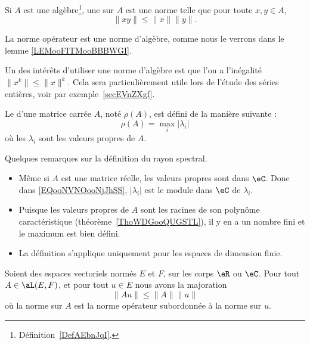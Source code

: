 \begin{definition}  \label{DefJWRWQue}
    Si \( A\) est une algèbre\footnote{Définition~\ref{DefAEbnJqI}.}, une  sur \( A\) est une norme telle que pour toute \( x,y\in A\),
    \begin{equation}
        \| xy \|\leq \| x \|\| y \|.
    \end{equation}
\end{definition}
La norme opérateur est une norme d'algèbre, comme nous le verrons dans le lemme \ref{LEMooFITMooBBBWGI}.

Un des intérêts d'utiliser une norme d'algèbre est que l'on a l'inégalité \( \| x^k \|\leq \| x \|^k \). Cela sera particulièrement utile lors de l'étude des séries entières, voir par exemple~\ref{secEVnZXgf}.

\begin{definition}      \label{DEFooEAUKooSsjqaL}
    Le  d'une matrice carrée $A$, noté $\rho(A)$, est défini de la manière suivante :
    \begin{equation}    \label{EQooNVNOooNjJhSS}
        \rho(A)=\max_i|\lambda_i|
    \end{equation}
    où les $\lambda_i$ sont les valeurs propres de $A$.
\end{definition}

\begin{normaltext}
    Quelques remarques sur la définition du rayon spectral.
    \begin{itemize}
        \item
            Même si \( A\) est une matrice réelle, les valeurs propres sont dans \( \eC\). Donc dans \eqref{EQooNVNOooNjJhSS}, \( | \lambda_i |\) est le module dans \( \eC\) de \( \lambda_i\).
        \item
            Puisque les valeurs propres de \( A\) sont les racines de son polynôme caractéristique (théorème~\ref{ThoWDGooQUGSTL}), il y en a un nombre fini et le maximum est bien défini.
        \item
            La définition s'applique uniquement pour les espaces de dimension finie.
    \end{itemize}
\end{normaltext}

\begin{lemma}       \label{LEMooIBLEooLJczmu}
    Soient des espaces vectoriels normés \( E\) et \( F\), sur les corps \( \eR\) ou \( \eC\). Pour tout \( A\in \aL(E,F)\), et pour tout \( u\in E\) nous avons la majoration
    \begin{equation}
        \| Au \|\leq \| A \|\| u \|
    \end{equation}
    où la norme sur \( A\) est la norme opérateur subordonnée à la norme sur \( u\).
\end{lemma}

